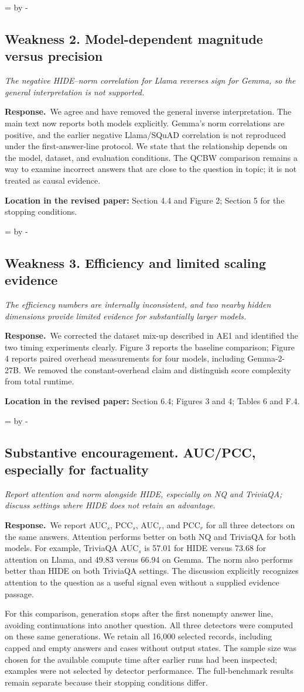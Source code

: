 \documentclass[11pt]{article}
\newcommand{\Needspace}[1]{\par\begingroup
  \dimen0=\pagegoal\advance\dimen0 by -\pagetotal
  \ifdim\dimen0<#1\relax\newpage\fi\endgroup}
\newcommand{\reviewcomment}[2]{%
  \Needspace{9\baselineskip}%
  \subsection*{#1}%
  \begin{tcolorbox}[enhanced,breakable,colback=gray!8,colframe=gray!50,
    boxrule=0pt,borderline west={2pt}{0pt}{gray!55},sharp corners]
  \itshape #2
  \end{tcolorbox}}
\newcommand{\response}{\textbf{Response.}\ }
\newcommand{\location}[1]{\par\textbf{Location in the revised paper:} #1\par}
\begin{document}
\reviewcomment{Weakness 2. Model-dependent magnitude versus precision}{The negative HIDE--norm correlation for Llama reverses sign for Gemma, so the general interpretation is not supported.}
\response We agree and have removed the general inverse interpretation. The main text now reports both models explicitly. Gemma's norm correlations are positive, and the earlier negative Llama/SQuAD correlation is not reproduced under the first-answer-line protocol. We state that the relationship depends on the model, dataset, and evaluation conditions. The QCBW comparison remains a way to examine incorrect answers that are close to the question in topic; it is not treated as causal evidence.
\location{Section 4.4 and Figure 2; Section 5 for the stopping conditions.}

\reviewcomment{Weakness 3. Efficiency and limited scaling evidence}{The efficiency numbers are internally inconsistent, and two nearby hidden dimensions provide limited evidence for substantially larger models.}
\response We corrected the dataset mix-up described in AE1 and identified the two timing experiments clearly. Figure 3 reports the baseline comparison; Figure 4 reports paired overhead measurements for four models, including Gemma-2-27B. We removed the constant-overhead claim and distinguish score complexity from total runtime.
\location{Section 6.4; Figures 3 and 4; Tables 6 and F.4.}

\reviewcomment{Substantive encouragement. AUC/PCC, especially for factuality}{Report attention and norm alongside HIDE, especially on NQ and TriviaQA; discuss settings where HIDE does not retain an advantage.}
\response We report AUC$_s$, PCC$_s$, AUC$_r$, and PCC$_r$ for all three detectors on the same answers. Attention performs better on both NQ and TriviaQA for both models. For example, TriviaQA AUC$_s$ is 57.01 for HIDE versus 73.68 for attention on Llama, and 49.83 versus 66.94 on Gemma. The norm also performs better than HIDE on both TriviaQA settings. The discussion explicitly recognizes attention to the question as a useful signal even without a supplied evidence passage.

For this comparison, generation stops after the first nonempty answer line, avoiding continuations into another question. All three detectors were computed on these same generations. We retain all 16,000 selected records, including capped and empty answers and cases without output states. The sample size was chosen for the available compute time after earlier runs had been inspected; examples were not selected by detector performance. The full-benchmark results remain separate because their stopping conditions differ.
\end{document}
